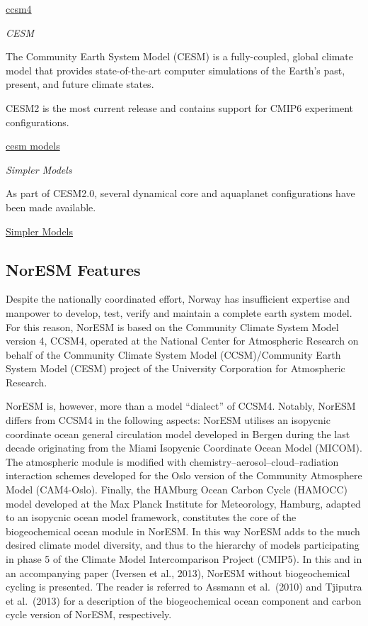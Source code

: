 \documentclass[
]{book}
\begin{document}
\href{https://www.cesm.ucar.edu/models/ccsm4.0/ccsm_doc/x42.html\#ccsm_machines}{ccsm4}

\emph{CESM}

The Community Earth System Model (CESM) is a fully-coupled, global climate model that provides state-of-the-art computer simulations of the Earth's past, present, and future climate states.

CESM2 is the most current release and contains support for CMIP6 experiment configurations.

\href{https://www.cesm.ucar.edu/models/}{cesm models}

\emph{Simpler Models}

As part of CESM2.0, several dynamical core and aquaplanet configurations have been made available.

\href{https://www.cesm.ucar.edu/models/simpler-models/}{Simpler Models}

\hypertarget{noresm-features}{%
\subsection{NorESM Features}\label{noresm-features}}

Despite the nationally coordinated effort, Norway has
insufficient expertise and manpower to develop, test, verify
and maintain a complete earth system model. For this reason,
NorESM is based on the Community Climate System Model version 4,
CCSM4, operated at the National Center for
Atmospheric Research on behalf of the Community Climate
System Model (CCSM)/Community Earth System Model
(CESM) project of the University Corporation for
Atmospheric Research.

NorESM is, however, more than a model
``dialect'' of CCSM4. Notably, NorESM differs from CCSM4
in the following aspects: NorESM utilises an isopycnic
coordinate ocean general circulation model developed in
Bergen during the last decade originating from the Miami Isopycnic Coordinate
Ocean Model (MICOM). The atmospheric module is modified with
chemistry--aerosol--cloud--radiation interaction schemes developed for the Oslo
version of the Community Atmosphere Model (CAM4-Oslo).
Finally, the HAMburg Ocean Carbon Cycle (HAMOCC) model developed at the Max Planck
Institute for Meteorology, Hamburg, adapted to an isopycnic ocean
model framework, constitutes the core of
the biogeochemical ocean module in NorESM.
In this way NorESM adds to the much desired climate model diversity,
and thus to the hierarchy of models participating in phase
5 of the Climate Model Intercomparison Project (CMIP5).
In this and in an accompanying paper (Iversen et al., 2013), NorESM without
biogeochemical cycling is presented.
The reader is referred to Assmann et al.~(2010) and Tjiputra et al.~(2013)
for a description of the biogeochemical ocean component and carbon
cycle version of NorESM, respectively.
\end{document}
